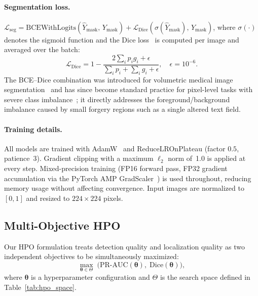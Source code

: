 \paragraph{Segmentation loss.}
$\mathcal{L}_{\text{seg}} = \text{BCEWithLogits}(\hat{Y}_{\text{mask}},\, Y_{\text{mask}})
  + \mathcal{L}_{\text{Dice}}(\sigma(\hat{Y}_{\text{mask}}),\, Y_{\text{mask}})$,
where $\sigma(\cdot)$ denotes the sigmoid function and the Dice
loss~\cite{dice1945} is computed per image and averaged over the batch:
\begin{equation}
  \mathcal{L}_{\text{Dice}} = 1 - \frac{2 \sum_i p_i g_i + \epsilon}
                                        {\sum_i p_i + \sum_i g_i + \epsilon},
  \quad \epsilon = 10^{-6}.
\end{equation}
The BCE--Dice combination was introduced for volumetric medical image
segmentation~\cite{milletari2016vnet} and has since become standard practice for
pixel-level tasks with severe class imbalance~\cite{unet2015}; it directly addresses
the foreground/background imbalance caused by small forgery regions such as a single
altered text field.

\paragraph{Training details.}
All models are trained with AdamW~\cite{adamw2019} and ReduceLROnPlateau (factor
$0.5$, patience~3). Gradient clipping with a maximum $\ell_2$ norm of~1.0 is
applied at every step. Mixed-precision training (FP16 forward pass, FP32 gradient
accumulation via the PyTorch AMP GradScaler~\cite{micikevicius2018mixed,pytorch2019})
is used throughout, reducing memory usage without affecting convergence.
Input images are normalized to $[0, 1]$ and resized to $224 \times 224$ pixels.

\subsection{Multi-Objective HPO}
\label{subsec:hpo}

Our HPO formulation treats detection quality and localization quality as two
independent objectives to be simultaneously maximized:
\begin{equation}
  \max_{\boldsymbol{\theta} \in \Theta}\; \bigl(\text{PR-AUC}(\boldsymbol{\theta}),\;
  \text{Dice}(\boldsymbol{\theta})\bigr),
  \label{eq:moopt}
\end{equation}
where $\boldsymbol{\theta}$ is a hyperparameter configuration and $\Theta$ is the
search space defined in Table~\ref{tab:hpo_space}.

